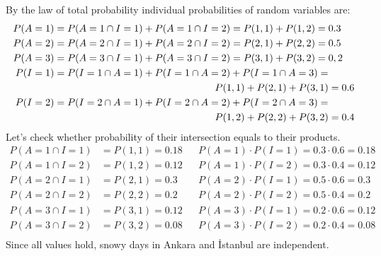 \documentclass[12pt]{article}
\begin{document}
By the law of total probability individual probabilities of random variables are:
\begin{align*}
    P(A=1) &= P(A=1 \cap I=1) + P(A=1 \cap I=2) = P(1,1) + P(1,2) = 0.3\\
    P(A=2) &= P(A=2 \cap I=1) + P(A=2 \cap I=2) = P(2,1) + P(2,2) = 0.5\\
    P(A=3) &= P(A=3 \cap I=1) + P(A=3 \cap I=2) = P(3,1) + P(3,2) = 0,2\\
    P(I=1) &= P(I=1 \cap A=1) + P(I=1 \cap A=2) + P(I=1 \cap A=3) =\\ 
    & \hspace{5.70cm} P(1,1) + P(2,1) + P(3,1) = 0.6\\
    P(I=2) &= P(I=2 \cap A=1) + P(I=2 \cap A=2) + P(I=2 \cap A=3) =\\ 
    & \hspace{5.70cm} P(1,2) + P(2,2) + P(3,2) = 0.4\\
\end{align*}
Let's check whether probability of their intersection equals to their products.
\begin{align*}
    P(A=1 \cap I=1) &= P(1,1) = 0.18 && P(A=1) \cdot P(I=1) = 0.3 \cdot 0.6 = 0.18\\
    P(A=1 \cap I=2) &= P(1,2) = 0.12 && P(A=1) \cdot P(I=2) = 0.3 \cdot 0.4 = 0.12\\
    P(A=2 \cap I=1) &= P(2,1) = 0.3 && P(A=2) \cdot P(I=1) = 0.5 \cdot 0.6 = 0.3\\
    P(A=2 \cap I=2) &= P(2,2) = 0.2 && P(A=2) \cdot P(I=2) = 0.5 \cdot 0.4 = 0.2\\
    P(A=3 \cap I=1) &= P(3,1) = 0.12 && P(A=3) \cdot P(I=1) = 0.2 \cdot 0.6 = 0.12\\
    P(A=3 \cap I=2) &= P(3,2) = 0.08 && P(A=3) \cdot P(I=2) = 0.2 \cdot 0.4 = 0.08\\
\end{align*}
Since all values hold, snowy days in Ankara and İstanbul are independent.
\end{document}
